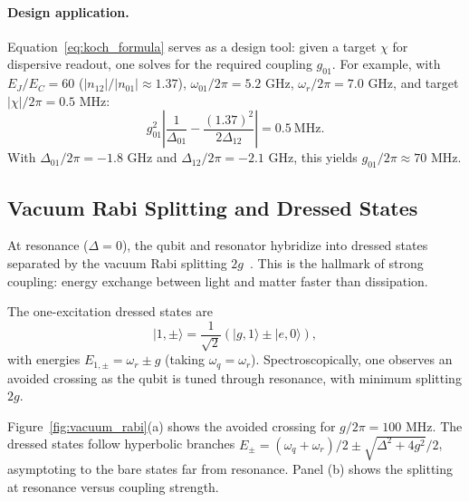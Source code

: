 \documentclass[reprint, floatfix, superscriptaddress, amsmath, amssymb, longbibliography]{revtex4-2}
\begin{document}
\paragraph{Design application.} Equation~\eqref{eq:koch_formula} serves as a design tool: given a target $\chi$ for dispersive readout, one solves for the required coupling $g_{01}$. For example, with $E_J/E_C = 60$ ($|n_{12}|/|n_{01}| \approx 1.37$), $\omega_{01}/2\pi = 5.2$ GHz, $\omega_r/2\pi = 7.0$ GHz, and target $|\chi|/2\pi = 0.5$ MHz:
\begin{equation}
g_{01}^2 \left|\frac{1}{\Delta_{01}} - \frac{(1.37)^2}{2\Delta_{12}}\right| = 0.5~\text{MHz}.
\end{equation}
With $\Delta_{01}/2\pi = -1.8$ GHz and $\Delta_{12}/2\pi = -2.1$ GHz, this yields $g_{01}/2\pi \approx 70$ MHz.

\subsection{Vacuum Rabi Splitting and Dressed States}
\label{sec:vacuum_rabi}

At resonance ($\Delta = 0$), the qubit and resonator hybridize into dressed states separated by the vacuum Rabi splitting $2g$~\cite{Wallraff2004}. This is the hallmark of strong coupling: energy exchange between light and matter faster than dissipation.

The one-excitation dressed states are
\begin{equation}
|1,\pm\rangle = \frac{1}{\sqrt{2}}(|g,1\rangle \pm |e,0\rangle),
\label{eq:dressed_one}
\end{equation}
with energies $E_{1,\pm} = \omega_r \pm g$ (taking $\omega_q = \omega_r$). Spectroscopically, one observes an avoided crossing as the qubit is tuned through resonance, with minimum splitting $2g$.

Figure~\ref{fig:vacuum_rabi}(a) shows the avoided crossing for $g/2\pi = 100$ MHz. The dressed states follow hyperbolic branches $E_\pm = (\omega_q + \omega_r)/2 \pm \sqrt{\Delta^2 + 4g^2}/2$, asymptoting to the bare states far from resonance. Panel (b) shows the splitting at resonance versus coupling strength.
\end{document}
